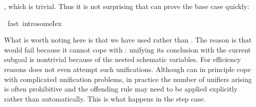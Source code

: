 \begin{isabellebody}
\begin{isamarkuptxt}
, which is trivial. Thus it is not surprising that
 can prove the base case quickly:%
\end{isamarkuptxt}%
\ fast\ intro{\isacharcolon}someI{}{\isacharunderscore}ex{\isacharparenright}%
\begin{isamarkuptxt}%
\noindent
What is worth noting here is that we have used  rather than
.  The reason is that  would fail because it cannot
cope with : unifying its conclusion with the current
subgoal is nontrivial because of the nested schematic variables. For
efficiency reasons  does not even attempt such unifications.
Although  can in principle cope with complicated unification
problems, in practice the number of unifiers arising is often prohibitive and
the offending rule may need to be applied explicitly rather than
automatically. This is what happens in the step case.


\end{isamarkuptxt}
\end{isabellebody}
